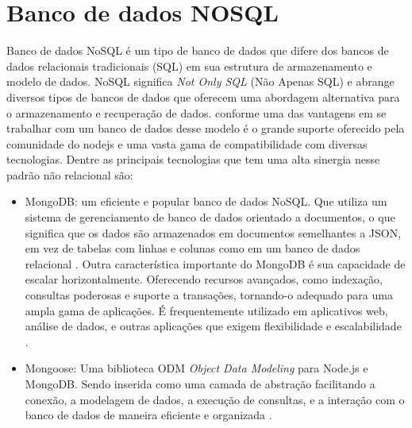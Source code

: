 \section{Banco de dados NOSQL}
Banco de dados NoSQL é um tipo de banco de dados que difere dos bancos de dados relacionais tradicionais (SQL) em sua estrutura de armazenamento e modelo de dados. NoSQL significa \textit{Not Only SQL} (Não Apenas SQL) e abrange diversos tipos de bancos de dados que oferecem uma abordagem alternativa para o armazenamento e recuperação de dados.
conforme \cite{pereira2014aplicações} uma das vantagens em se trabalhar com um banco de dados desse modelo é o grande suporte oferecido pela comunidade do nodejs e uma vasta gama de compatibilidade com diversas tecnologias.
Dentre as principais tecnologias que tem uma alta sinergia nesse padrão não relacional são: 


\begin{itemize}
    \item MongoDB: um eficiente e popular banco de dados NoSQL. Que utiliza um sistema de gerenciamento de banco de dados orientado a documentos, o que significa que os dados são armazenados em documentos semelhantes a JSON, em vez de tabelas com linhas e colunas como em um banco de dados relacional \cite{pereira2014aplicações}.
    Outra característica importante do MongoDB é sua capacidade de escalar horizontalmente. Oferecendo recursos avançados, como indexação, consultas poderosas e suporte a transações, tornando-o adequado para uma ampla gama de aplicações. É frequentemente utilizado em aplicativos web, análise de dados, e outras aplicações que exigem flexibilidade e escalabilidade \cite{pereira2014aplicações}.
    \item Mongoose:  Uma biblioteca ODM \textit{Object Data Modeling} para Node.js e MongoDB. Sendo inserida como uma camada de abstração facilitando a conexão, a modelagem de dados, a execução de consultas, e a interação com o banco de dados de maneira eficiente e organizada \cite{pereira2014aplicações}.

\end{itemize}



